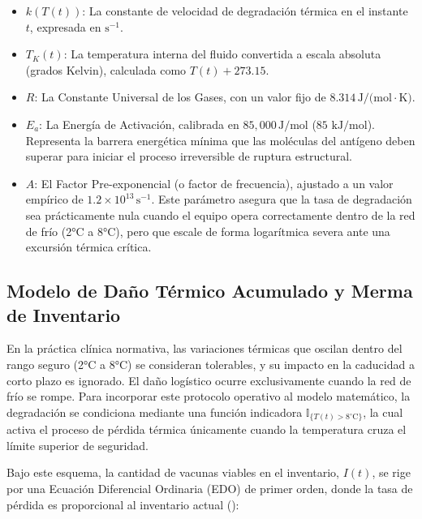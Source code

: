 \documentclass[
  spanish,
  letterpaper,
  DIV=11,
  numbers=noendperiod]{scrreprt}
\providecommand{\tightlist}{%
  \setlength{\itemsep}{0pt}\setlength{\parskip}{0pt}}
\theoremstyle{plain}
\theoremstyle{plain}
\theoremstyle{plain}
\theoremstyle{definition}
\theoremstyle{remark}
\begin{document}
\begin{itemize}
\tightlist
\item
  \textbf{\(k(T(t))\)}: La constante de velocidad de degradación térmica
  en el instante \(t\), expresada en \(\text{s}^{-1}\).
\item
  \textbf{\(T_K(t)\)}: La temperatura interna del fluido convertida a
  escala absoluta (grados Kelvin), calculada como \(T(t) + 273.15\).
\item
  \textbf{\(R\)}: La Constante Universal de los Gases, con un valor fijo
  de \(8.314 \, \text{J/(mol} \cdot \text{K)}\).
\item
  \textbf{\(E_a\)}: La Energía de Activación, calibrada en
  \textbf{\(85,000 \, \text{J/mol}\)} (\(85 \text{ kJ/mol}\)).
  Representa la barrera energética mínima que las moléculas del antígeno
  deben superar para iniciar el proceso irreversible de ruptura
  estructural.
\item
  \textbf{\(A\)}: El Factor Pre-exponencial (o factor de frecuencia),
  ajustado a un valor empírico de
  \textbf{\(1.2 \times 10^{13} \, \text{s}^{-1}\)}. Este parámetro
  asegura que la tasa de degradación sea prácticamente nula cuando el
  equipo opera correctamente dentro de la red de frío (2°C a 8°C), pero
  que escale de forma logarítmica severa ante una excursión térmica
  crítica.
\end{itemize}

\subsection{Modelo de Daño Térmico Acumulado y Merma de
Inventario}\label{modelo-de-dauxf1o-tuxe9rmico-acumulado-y-merma-de-inventario}

En la práctica clínica normativa, las variaciones térmicas que oscilan
dentro del rango seguro (2°C a 8°C) se consideran tolerables, y su
impacto en la caducidad a corto plazo es ignorado. El daño logístico
ocurre exclusivamente cuando la red de frío se rompe. Para incorporar
este protocolo operativo al modelo matemático, la degradación se
condiciona mediante una función indicadora
\(\mathbb{I}_{\{T(t) > 8^\circ\text{C}\}}\), la cual activa el proceso
de pérdida térmica únicamente cuando la temperatura cruza el límite
superior de seguridad.

Bajo este esquema, la cantidad de vacunas viables en el inventario,
\(I(t)\), se rige por una Ecuación Diferencial Ordinaria (EDO) de primer
orden, donde la tasa de pérdida es proporcional al inventario actual
():
\end{document}
